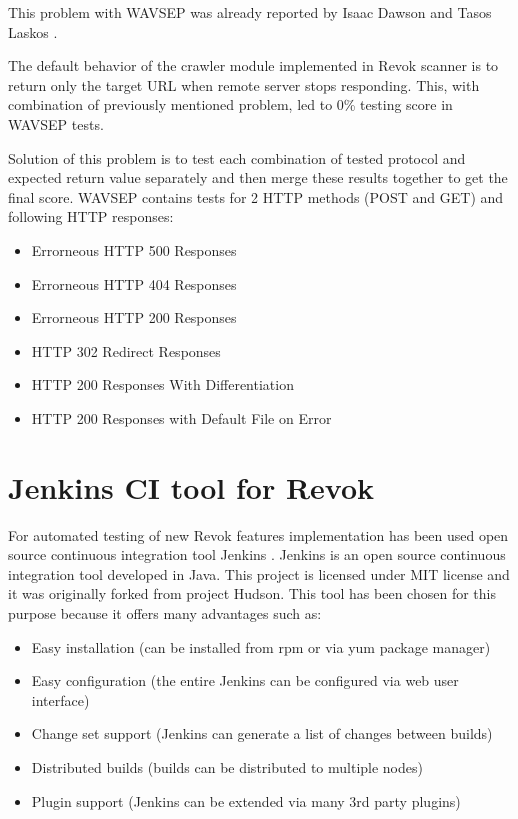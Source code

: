 		This problem with WAVSEP was already reported by Isaac Dawson \cite{OWASPIssue1} and Tasos Laskos \cite{OWASPIssue2}.
		
		The default behavior of the crawler module implemented in Revok scanner is to return only the target URL when remote server stops responding. This, with combination of previously mentioned problem, led to 0\% testing score in WAVSEP tests.
		
		Solution of this problem is to test each combination of tested protocol and expected return value separately and then merge these results together to get the final score. WAVSEP contains tests for 2 HTTP methods (POST and GET) and following HTTP responses:
		
		\begin{itemize}
			\item Errorneous HTTP 500 Responses
			\item Errorneous HTTP 404 Responses
			\item Errorneous HTTP 200 Responses
			\item HTTP 302 Redirect Responses
			\item HTTP 200 Responses With Differentiation
			\item HTTP 200 Responses with Default File on Error
		\end{itemize}		
		

	\section{Jenkins CI tool for Revok}\label{jenkins}
	
		For automated testing of new Revok features implementation has been used open source continuous integration tool Jenkins \cite{jenkins}. Jenkins  is an open source continuous integration tool developed in Java. This project is licensed under MIT \cite{MIT} license and it was originally forked from project Hudson. This tool has been chosen for this purpose because it offers many advantages such as:
		
		\begin{itemize}
			\item Easy installation (can be installed from rpm or via yum package manager)
			\item Easy configuration (the entire Jenkins can be configured via web user interface)
			\item Change set support (Jenkins can generate a list of changes between builds)
			\item Distributed builds (builds can be distributed to multiple nodes)
			\item Plugin support (Jenkins can be extended via many 3rd party plugins)
		\end{itemize}
		
